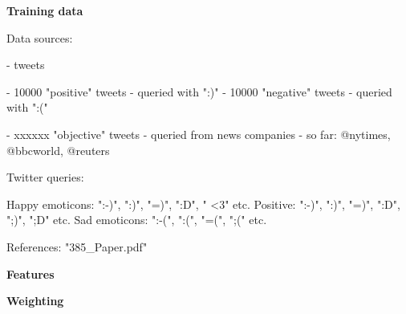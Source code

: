 



\textbf{Training data}

Data sources:

- tweets

- 10000 "positive" tweets - queried with ":)"
- 10000 "negative" tweets - queried with ":("

- xxxxxx "objective" tweets - queried from news companies - so far: @nytimes, @bbcworld, @reuters



Twitter queries: 

Happy emoticons: ":-)", ":)", "=)", ":D", " <3" etc.
Positive: ":-)", ":)", "=)", ":D", ";)", ";D" etc.
Sad emoticons: ":-(", ":(", "=(", ";(" etc.


References: "385_Paper.pdf"


\textbf{Features}





\textbf{Weighting}





